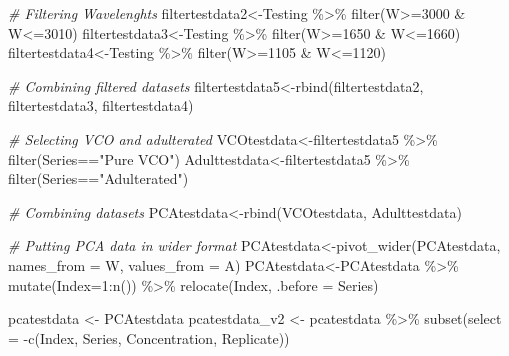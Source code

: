 \documentclass[
]{article}
\newenvironment{Shaded}{\begin{snugshade}}{\end{snugshade}}
\newcommand{\AttributeTok}[1]{\textcolor[rgb]{0.77,0.63,0.00}{#1}}
\newcommand{\CommentTok}[1]{\textcolor[rgb]{0.56,0.35,0.01}{\textit{#1}}}
\newcommand{\DecValTok}[1]{\textcolor[rgb]{0.00,0.00,0.81}{#1}}
\newcommand{\FunctionTok}[1]{\textcolor[rgb]{0.00,0.00,0.00}{#1}}
\newcommand{\NormalTok}[1]{#1}
\newcommand{\OtherTok}[1]{\textcolor[rgb]{0.56,0.35,0.01}{#1}}
\newcommand{\SpecialCharTok}[1]{\textcolor[rgb]{0.00,0.00,0.00}{#1}}
\newcommand{\StringTok}[1]{\textcolor[rgb]{0.31,0.60,0.02}{#1}}
\begin{document}
\begin{Shaded}
\begin{Highlighting}[]
  \CommentTok{\# Filtering Wavelenghts}
\NormalTok{  filtertestdata2}\OtherTok{\textless{}{-}}\NormalTok{Testing }\SpecialCharTok{\%\textgreater{}\%} \FunctionTok{filter}\NormalTok{(W}\SpecialCharTok{\textgreater{}=}\DecValTok{3000} \SpecialCharTok{\&}\NormalTok{ W}\SpecialCharTok{\textless{}=}\DecValTok{3010}\NormalTok{)}
\NormalTok{  filtertestdata3}\OtherTok{\textless{}{-}}\NormalTok{Testing }\SpecialCharTok{\%\textgreater{}\%} \FunctionTok{filter}\NormalTok{(W}\SpecialCharTok{\textgreater{}=}\DecValTok{1650} \SpecialCharTok{\&}\NormalTok{ W}\SpecialCharTok{\textless{}=}\DecValTok{1660}\NormalTok{)}
\NormalTok{  filtertestdata4}\OtherTok{\textless{}{-}}\NormalTok{Testing }\SpecialCharTok{\%\textgreater{}\%} \FunctionTok{filter}\NormalTok{(W}\SpecialCharTok{\textgreater{}=}\DecValTok{1105} \SpecialCharTok{\&}\NormalTok{ W}\SpecialCharTok{\textless{}=}\DecValTok{1120}\NormalTok{)}
  
  \CommentTok{\# Combining filtered datasets}
\NormalTok{  filtertestdata5}\OtherTok{\textless{}{-}}\FunctionTok{rbind}\NormalTok{(filtertestdata2, filtertestdata3, filtertestdata4) }
  
  \CommentTok{\# Selecting VCO and adulterated}
\NormalTok{  VCOtestdata}\OtherTok{\textless{}{-}}\NormalTok{filtertestdata5 }\SpecialCharTok{\%\textgreater{}\%} \FunctionTok{filter}\NormalTok{(Series}\SpecialCharTok{==}\StringTok{"Pure VCO"}\NormalTok{)}
\NormalTok{  Adulttestdata}\OtherTok{\textless{}{-}}\NormalTok{filtertestdata5 }\SpecialCharTok{\%\textgreater{}\%} \FunctionTok{filter}\NormalTok{(Series}\SpecialCharTok{==}\StringTok{"Adulterated"}\NormalTok{)}
  
  \CommentTok{\# Combining datasets}
\NormalTok{  PCAtestdata}\OtherTok{\textless{}{-}}\FunctionTok{rbind}\NormalTok{(VCOtestdata, Adulttestdata)}
  
  \CommentTok{\# Putting PCA data in wider format}
\NormalTok{  PCAtestdata}\OtherTok{\textless{}{-}}\FunctionTok{pivot\_wider}\NormalTok{(PCAtestdata, }\AttributeTok{names\_from =}\NormalTok{ W, }\AttributeTok{values\_from =}\NormalTok{ A)}
\NormalTok{  PCAtestdata}\OtherTok{\textless{}{-}}\NormalTok{PCAtestdata }\SpecialCharTok{\%\textgreater{}\%} \FunctionTok{mutate}\NormalTok{(}\AttributeTok{Index=}\DecValTok{1}\SpecialCharTok{:}\FunctionTok{n}\NormalTok{()) }\SpecialCharTok{\%\textgreater{}\%} \FunctionTok{relocate}\NormalTok{(Index, }\AttributeTok{.before =}\NormalTok{ Series)}
  
\NormalTok{  pcatestdata }\OtherTok{\textless{}{-}}\NormalTok{  PCAtestdata}
\NormalTok{  pcatestdata\_v2 }\OtherTok{\textless{}{-}}\NormalTok{ pcatestdata }\SpecialCharTok{\%\textgreater{}\%} \FunctionTok{subset}\NormalTok{(}\AttributeTok{select =} \SpecialCharTok{{-}}\FunctionTok{c}\NormalTok{(Index, Series, Concentration, Replicate))}
  

\end{Highlighting}
\end{Shaded}
\end{document}
